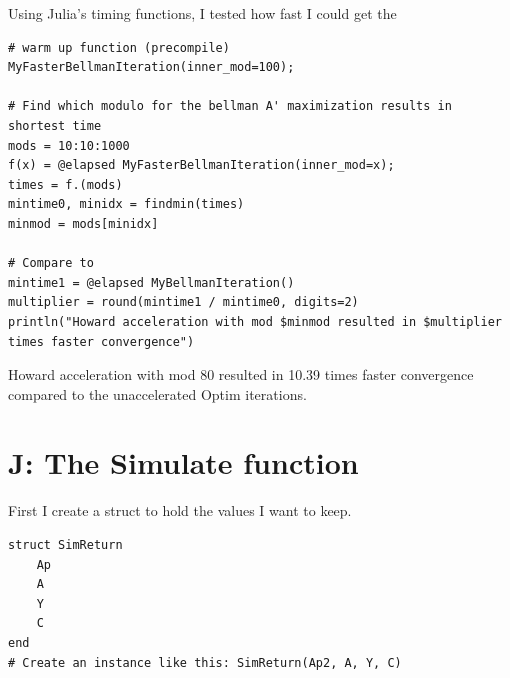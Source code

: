 \documentclass[12pt]{article}
\begin{document}
Using Julia's timing functions, I tested how fast I could get the 
\begin{lstlisting}[language=JuliaLocal, style=julia]
# warm up function (precompile)
MyFasterBellmanIteration(inner_mod=100);

# Find which modulo for the bellman A' maximization results in shortest time
mods = 10:10:1000
f(x) = @elapsed MyFasterBellmanIteration(inner_mod=x);
times = f.(mods)
mintime0, minidx = findmin(times)
minmod = mods[minidx]

# Compare to 
mintime1 = @elapsed MyBellmanIteration()
multiplier = round(mintime1 / mintime0, digits=2)
println("Howard acceleration with mod $minmod resulted in $multiplier times faster convergence")
\end{lstlisting}



Howard acceleration with mod 80 resulted in 10.39 times faster convergence compared to the unaccelerated Optim iterations.









\newpage
\section*{J: The Simulate function}

First I create a struct to hold the values I want to keep.
\begin{lstlisting}[language=JuliaLocal, style=julia]
struct SimReturn
    Ap
    A
    Y
    C
end
# Create an instance like this: SimReturn(Ap2, A, Y, C)
\end{lstlisting}
\end{document}
